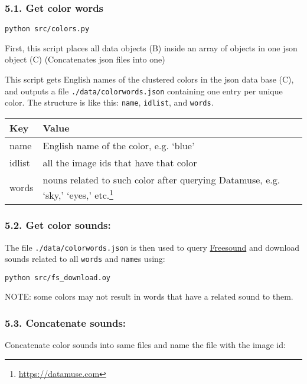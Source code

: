 \subsubsection*{5.1. Get color words}

\texttt{python\ src/colors.py}

First, this script places all data objects (B) inside an array of objects in one \gls{json} object (C) (Concatenates \gls{json} files into one)

This script gets English names of the clustered colors in the \gls{json} data base (C), and outputs a file \texttt{./data/colorwords.json} containing one entry per unique color. The structure is like this: \texttt{name}, \texttt{idlist}, and \texttt{words}.

\begin{table}
\begin{tabular}{l | l}

Key     & Value

\tabularnewline
\hline


name    & English name of the color, e.g. `blue'

\tabularnewline
\hline

idlist  & all the image ids that have that color

\tabularnewline
\hline

words   & nouns related to such color after querying Datamuse, e.g. `sky,' `eyes,' etc.\footnote{\url{https://datamuse.com}} 

\end{tabular}
\end{table}


\subsubsection*{5.2. Get color sounds:}

The file \texttt{./data/colorwords.json} is then used to query \href{https://freesound.org}{Freesound} and download sounds related to all \texttt{words} and \texttt{name}s using:

\texttt{python\ src/fs\_download.oy}

NOTE: some colors may not result in words that have a related sound to them.


\subsubsection*{5.3. Concatenate sounds:}

Concatenate color sounds into same files and name the file with the image id:

